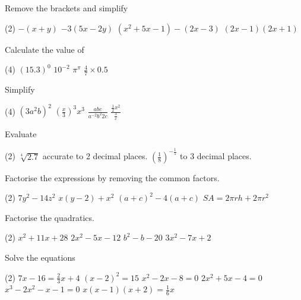 \begin{Exercise}[title={Algebra Review},label=ex11]
\Question Remove the brackets and simplify
\begin{tasks}(2)
	\task 	 $ -\left (x +y\right )$ %
	\task    $ -3 (5 x -2 y)$	%
	\task 	$\left (x^{2} +5 x -1\right ) -\left (2 x -3\right )$%
	\task    $\left (2 x -1\right ) \left (2 x +1\right )$%
\end{tasks}

\Question Calculate the value of
\begin{tasks}(4)
	\task 	 $\left (15.3\right )^{0}$
	\task    $10^{ -2}$
	\task	$\pi^\pi$%
	\task	$\frac{4}{7}\times 0.5$%
\end{tasks}
 
\Question Simplify
\begin{tasks}(4)
	\task 	 $\left (3 a^{2} b\right )^{2}$%
	\task    $\left(\frac{x}{3}\right)^{3} x^{3}$%
	\task	$\displaystyle \frac{abc}{a^{-2}b^2 2c}$%
	\task	$\displaystyle \frac{\frac{1}{2}x^2}{\frac{3}{x}}$%
\end{tasks}

\Question Evaluate
\begin{tasks}(2)
	\task 	 $\sqrt[{4}]{2.7}$ accurate to 2 decimal places. %
	\task    $ \left(\frac{1}{8}\right)^{-\frac{1}{5}}$ to 3 decimal places.%
\end{tasks}

\Question Factorise the expressions by removing the common factors.
\begin{tasks}(2)
	\task 	$7y^2-14z^2$%
	\task  $x(y-2)+x^2$%
	\task $(a+c)^2-4(a+c)$%
	\task $SA=2\pi r h+2\pi r^2$%
\end{tasks}

\Question Factorise the quadratics.
\begin{tasks}(2)
	\task $x^{2} +11 x +28$%
	\task $2 x^{2} -5 x -12$%
	\task $b^2-b-20$%
	\task $3x^2-7x+2$%
\end{tasks}

\Question Solve the equations
\begin{tasks}(2)
	\task 	 $7 x -16 =\frac{2}{3} x +4$ %
	\task   $\left (x -2\right )^{2} =15$%
	\task 	$x^{2} -2 x -8 =0$%
	\task   $2 x^{2} +5 x -4 =0$%
	\task	$x^{3} -2 x^{2} -x -1 =0$%
	\task	$x \left (x -1\right ) \left (x +2\right ) =\frac{1}{6} x$%
\end{tasks}
\end{Exercise}

